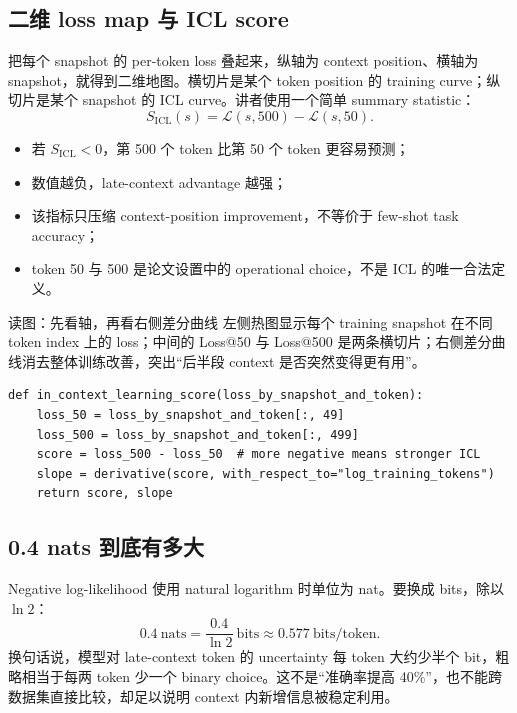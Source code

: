 \subsection{二维 loss map 与 ICL score}

把每个 snapshot 的 per-token loss 叠起来，纵轴为 context position、横轴为 snapshot，就得到二维地图。横切片是某个 token position 的 training curve；纵切片是某个 snapshot 的 ICL curve。讲者使用一个简单 summary statistic：
\[
S_{\mathrm{ICL}}(s)
=\mathcal{L}(s,500)-\mathcal{L}(s,50).
\]

\begin{itemize}
  \item 若 $S_{\mathrm{ICL}}<0$，第 500 个 token 比第 50 个 token 更容易预测；
  \item 数值越负，late-context advantage 越强；
  \item 该指标只压缩 context-position improvement，不等价于 few-shot task accuracy；
  \item token 50 与 500 是论文设置中的 operational choice，不是 ICL 的唯一合法定义。
\end{itemize}


\begin{knowledgebox}{读图：先看轴，再看右侧差分曲线}
左侧热图显示每个 training snapshot 在不同 token index 上的 loss；中间的 Loss@50 与 Loss@500 是两条横切片；右侧差分曲线消去整体训练改善，突出“后半段 context 是否突然变得更有用”。
\end{knowledgebox}

\begin{lstlisting}[caption={从 per-token loss 计算 ICL score 与 phase-change diagnostic。}]
def in_context_learning_score(loss_by_snapshot_and_token):
    loss_50 = loss_by_snapshot_and_token[:, 49]
    loss_500 = loss_by_snapshot_and_token[:, 499]
    score = loss_500 - loss_50  # more negative means stronger ICL
    slope = derivative(score, with_respect_to="log_training_tokens")
    return score, slope
\end{lstlisting}

\subsection{0.4 nats 到底有多大}

Negative log-likelihood 使用 natural logarithm 时单位为 nat。要换成 bits，除以 $\ln 2$：
\[
0.4\ \mathrm{nats}
=\frac{0.4}{\ln 2}\ \mathrm{bits}
\approx 0.577\ \mathrm{bits/token}.
\]
换句话说，模型对 late-context token 的 uncertainty 每 token 大约少半个 bit，粗略相当于每两 token 少一个 binary choice。这不是“准确率提高 40\%”，也不能跨数据集直接比较，却足以说明 context 内新增信息被稳定利用。

